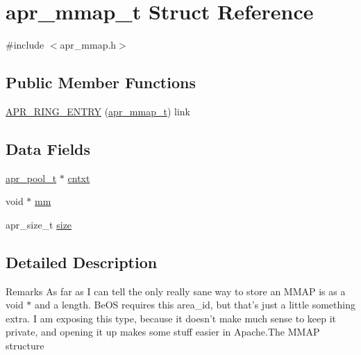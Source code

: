 \hypertarget{structapr__mmap__t}{\section{apr\-\_\-mmap\-\_\-t Struct Reference}
\label{structapr__mmap__t}
}


{\ttfamily \#include $<$apr\-\_\-mmap.\-h$>$}

\subsection*{Public Member Functions}
\begin{DoxyCompactItemize}
\item 
\hyperlink{structapr__mmap__t_aeca30aed7539548d31b7c0115020af62}{A\-P\-R\-\_\-\-R\-I\-N\-G\-\_\-\-E\-N\-T\-R\-Y} (\hyperlink{structapr__mmap__t}{apr\-\_\-mmap\-\_\-t}) link
\end{DoxyCompactItemize}
\subsection*{Data Fields}
\begin{DoxyCompactItemize}
\item 
\hyperlink{group__apr__pools_gaf137f28edcf9a086cd6bc36c20d7cdfb}{apr\-\_\-pool\-\_\-t} $\ast$ \hyperlink{structapr__mmap__t_a42d01080278bbc9bad26728f9a71c492}{cntxt}
\item 
void $\ast$ \hyperlink{structapr__mmap__t_abcc62d7e7c8187311e6619faf0d44f19}{mm}
\item 
apr\-\_\-size\-\_\-t \hyperlink{structapr__mmap__t_a274aea0906a4b674e1642ac9e81966c7}{size}
\end{DoxyCompactItemize}


\subsection{Detailed Description}
\begin{DoxyRemark}{Remarks}
As far as I can tell the only really sane way to store an M\-M\-A\-P is as a void $\ast$ and a length. Be\-O\-S requires this area\-\_\-id, but that's just a little something extra. I am exposing this type, because it doesn't make much sense to keep it private, and opening it up makes some stuff easier in Apache.\-The M\-M\-A\-P structure 
\end{DoxyRemark}


